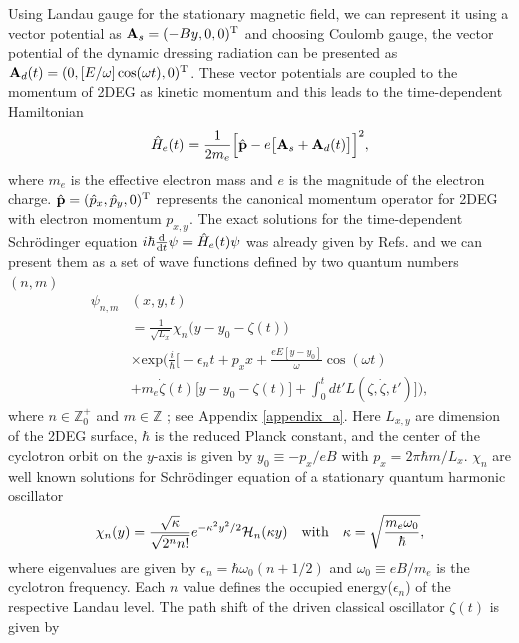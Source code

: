 Using Landau gauge for the stationary magnetic field, we can represent it using a vector potential as $\vb{A}_{s} = (-By,0,0)^{\text{T}}$ and choosing Coulomb gauge, the vector potential of the dynamic dressing radiation can be presented as $\vb{A}_{d}(t) = (0,[E/\omega ]\cos(\omega t),0)^{\text{T}}$. These vector potentials are coupled to the momentum of 2DEG as kinetic momentum \cite{mahan00,bruus04} and this leads to the time-dependent Hamiltonian
\begin{equation} \label{eq_1}
  \hat{H}_e(t) = \frac{1}{2m_e}\Big[\hat{\vb{p}} - e\big[\vb{A}_{s}+\vb{A}_{d}(t)\big]\Big]^2,
\end{equation}
where $m_e$ is the effective electron mass and $e$ is the magnitude of the electron charge. $\hat{\vb{p}} = (\hat{p}_x,\hat{p}_y,0)^{\text{T}}$ represents the canonical momentum operator for 2DEG with electron momentum $p_{x,y}$.
The exact solutions for the time-dependent Schrödinger equation $i\hbar \dv{t}\psi = \hat{H}_e(t) \psi$ was already given by Refs. \cite{husimi53,ditt98,dini16} and we can present them as a set of wave functions defined by two quantum numbers $(n,m)$
\begin{equation} \label{eq_2}
  \begin{aligned}
    \psi_{n,m}&(x,y,t)  \\
    & = \frac{1}{\sqrt{L_x}}
    \chi_n\big(y - y_0 - \zeta(t)\big)\\
    & \times
    \text{exp}\bigg(
    \frac{i}{\hbar}\bigg[- \epsilon_n t
    + p_x x + \frac{eE[y - y_0]}{\omega}\cos(\omega t)\\
    &+
    m_e\dot{\zeta}(t)\big[y - y_0 -\zeta(t)\big] +
    \int_0^{t}dt'L(\zeta,\dot{\zeta},t')\bigg]\bigg),
  \end{aligned}
\end{equation}
where $n \in \mathbb{Z}^{+}_0$ and $m \in \mathbb{Z}$ ; see Appendix \ref{appendix_a}. Here $L_{x,y}$ are dimension of the 2DEG surface, $\hbar$ is the reduced Planck constant, and the center of the cyclotron orbit on the $y$-axis is given by $y_0 \equiv -p_x/eB$ with $p_x = 2\pi \hbar m/L_x$. $\chi_n$ are well known solutions for Schrödinger equation of a stationary quantum harmonic oscillator
\begin{equation} \label{eq_3}
  \chi_n(y) =
   \frac{\sqrt{\kappa}}{\sqrt{2^{n}n!}}
  e^{-\kappa^2 y^2/2}
  \mathcal{H}_n \qty(\kappa y) \quad \text{with}
  \quad
  \kappa = \sqrt{\frac{m_e \omega_0}{\hbar}},
\end{equation}
where eigenvalues are given by $\epsilon_n = \hbar \omega_0 (n + 1/2)$ and $\omega_0 \equiv eB/m_e$ is the cyclotron frequency. Each $n$ value defines the occupied energy($\epsilon_n$) of the respective Landau level. The path shift of the driven classical oscillator $\zeta(t)$ is given by

